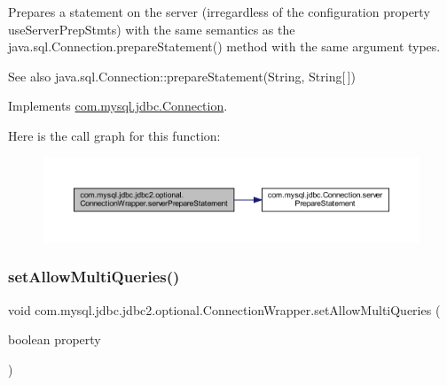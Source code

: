 Prepares a statement on the server (irregardless of the configuration property \textquotesingle{}use\+Server\+Prep\+Stmts\textquotesingle{}) with the same semantics as the java.\+sql.\+Connection.\+prepare\+Statement() method with the same argument types.

\begin{DoxySeeAlso}{See also}
java.\+sql.\+Connection\+::prepare\+Statement(\+String, String\mbox{[}$\,$\mbox{]}) 
\end{DoxySeeAlso}


Implements \mbox{\hyperlink{interfacecom_1_1mysql_1_1jdbc_1_1_connection_a7bbac014ef6bb3ad113c039f71af4bd9}{com.\+mysql.\+jdbc.\+Connection}}.

Here is the call graph for this function\+:
\nopagebreak
\begin{figure}[H]
\begin{center}
\leavevmode
\includegraphics[width=350pt]{classcom_1_1mysql_1_1jdbc_1_1jdbc2_1_1optional_1_1_connection_wrapper_ab46a28f09e096cc8901db389bc4e6016_cgraph}
\end{center}
\end{figure}
\mbox{\label{classcom_1_1mysql_1_1jdbc_1_1jdbc2_1_1optional_1_1_connection_wrapper_a4a74a98581dab1e4f5bd0dde12c2ab23}} 
\subsubsection{\texorpdfstring{set\+Allow\+Multi\+Queries()}{setAllowMultiQueries()}}
{\footnotesize\ttfamily void com.\+mysql.\+jdbc.\+jdbc2.\+optional.\+Connection\+Wrapper.\+set\+Allow\+Multi\+Queries (\begin{DoxyParamCaption}\item[{boolean}]{property }\end{DoxyParamCaption})}


